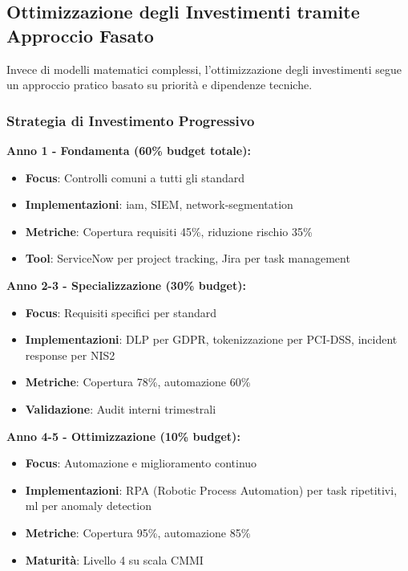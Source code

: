 \subsection{Ottimizzazione degli Investimenti tramite Approccio Fasato}

Invece di modelli matematici complessi, l'ottimizzazione degli investimenti segue un approccio pratico basato su priorità e dipendenze tecniche\autocite{Bertsekas2017}.

\subsubsection{Strategia di Investimento Progressivo}

\textbf{Anno 1 - Fondamenta (60\% budget totale):}
\begin{itemize}
    \item \textbf{Focus}: Controlli comuni a tutti gli standard
    \item \textbf{Implementazioni}: \gls{iam}, SIEM, \gls{network-segmentation}
    \item \textbf{Metriche}: Copertura requisiti 45\%, riduzione rischio 35\%
    \item \textbf{Tool}: ServiceNow per project tracking, Jira per task management
\end{itemize}

\textbf{Anno 2-3 - Specializzazione (30\% budget):}
\begin{itemize}
    \item \textbf{Focus}: Requisiti specifici per standard
    \item \textbf{Implementazioni}: DLP per GDPR, tokenizzazione per PCI-DSS, incident response per NIS2
    \item \textbf{Metriche}: Copertura 78\%, automazione 60\%
    \item \textbf{Validazione}: Audit interni trimestrali
\end{itemize}

\textbf{Anno 4-5 - Ottimizzazione (10\% budget):}
\begin{itemize}
    \item \textbf{Focus}: Automazione e miglioramento continuo
    \item \textbf{Implementazioni}: RPA (Robotic Process Automation) per task ripetitivi, \gls{ml} per anomaly detection
    \item \textbf{Metriche}: Copertura 95\%, automazione 85\%
    \item \textbf{Maturità}: Livello 4 su scala CMMI
\end{itemize}

